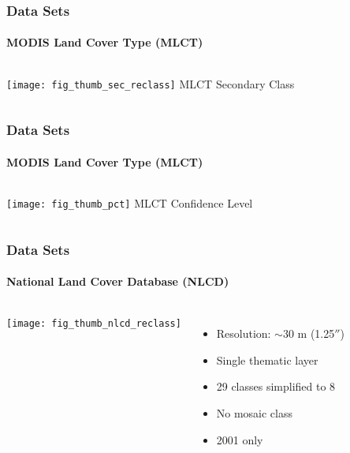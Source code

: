 \documentclass{beamer}
\begin{document}
\begin{frame}
  \frametitle{Data Sets}
  \framesubtitle{MODIS Land Cover Type (MLCT)}
  \begin{columns}
    \column{2.5in}
    \texttt{[image: fig\_thumb\_sec\_reclass]}
    \column[T]{2.5in}
    MLCT Secondary Class
  \end{columns}
\end{frame}

\begin{frame}
  \frametitle{Data Sets}
  \framesubtitle{MODIS Land Cover Type (MLCT)}
  \begin{columns}
    \column{2.5in}
    \texttt{[image: fig\_thumb\_pct]}
    \column[T]{2.5in}
    MLCT Confidence Level
  \end{columns}
\end{frame}



\begin{frame}
  \frametitle{Data Sets}
  \framesubtitle{National Land Cover Database (NLCD)}
  \begin{columns}
    \column{2.5in}
    \texttt{[image: fig\_thumb\_nlcd\_reclass]}    
    \column{2.5in}
    \begin{itemize}
      \pause
    \item Resolution: $\sim$30 m (1.25$''$)
      \pause
    \item Single thematic layer
      \pause
    \item 29 classes simplified to 8
      \pause
    \item No mosaic class
      \pause
    \item 2001 only
    \end{itemize}
  \end{columns}
\end{frame}
\end{document}
